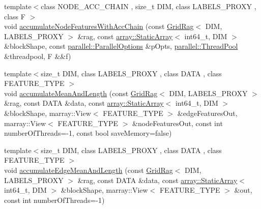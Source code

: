 \begin{DoxyCompactItemize}
\item 
{\footnotesize template$<$class N\+O\+D\+E\+\_\+\+A\+C\+C\+\_\+\+C\+H\+A\+I\+N , size\+\_\+t D\+I\+M, class L\+A\+B\+E\+L\+S\+\_\+\+P\+R\+O\+X\+Y , class F $>$ }\\void \hyperlink{namespacenifty_1_1graph_a1464a1e4da963bdaf932c41c042f734e}{accumulate\+Node\+Features\+With\+Acc\+Chain} (const \hyperlink{classnifty_1_1graph_1_1GridRag}{Grid\+Rag}$<$ D\+I\+M, L\+A\+B\+E\+L\+S\+\_\+\+P\+R\+O\+X\+Y $>$ \&rag, const \hyperlink{namespacenifty_1_1array_a683f151f19c851754e0c6d55ed16a0c2}{array\+::\+Static\+Array}$<$ int64\+\_\+t, D\+I\+M $>$ \&block\+Shape, const \hyperlink{classnifty_1_1parallel_1_1ParallelOptions}{parallel\+::\+Parallel\+Options} \&p\+Opts, \hyperlink{classnifty_1_1parallel_1_1ThreadPool}{parallel\+::\+Thread\+Pool} \&threadpool, F \&\&f)
\item 
{\footnotesize template$<$size\+\_\+t D\+I\+M, class L\+A\+B\+E\+L\+S\+\_\+\+P\+R\+O\+X\+Y , class D\+A\+T\+A , class F\+E\+A\+T\+U\+R\+E\+\_\+\+T\+Y\+P\+E $>$ }\\void \hyperlink{namespacenifty_1_1graph_afa27dafc0727ab9fb2d7e5e5fa23996b}{accumulate\+Mean\+And\+Length} (const \hyperlink{classnifty_1_1graph_1_1GridRag}{Grid\+Rag}$<$ D\+I\+M, L\+A\+B\+E\+L\+S\+\_\+\+P\+R\+O\+X\+Y $>$ \&rag, const D\+A\+T\+A \&data, const \hyperlink{namespacenifty_1_1array_a683f151f19c851754e0c6d55ed16a0c2}{array\+::\+Static\+Array}$<$ int64\+\_\+t, D\+I\+M $>$ \&block\+Shape, marray\+::\+View$<$ F\+E\+A\+T\+U\+R\+E\+\_\+\+T\+Y\+P\+E $>$ \&edge\+Features\+Out, marray\+::\+View$<$ F\+E\+A\+T\+U\+R\+E\+\_\+\+T\+Y\+P\+E $>$ \&node\+Features\+Out, const int number\+Of\+Threads=-\/1, const bool save\+Memory=false)
\item 
{\footnotesize template$<$size\+\_\+t D\+I\+M, class L\+A\+B\+E\+L\+S\+\_\+\+P\+R\+O\+X\+Y , class D\+A\+T\+A , class F\+E\+A\+T\+U\+R\+E\+\_\+\+T\+Y\+P\+E $>$ }\\void \hyperlink{namespacenifty_1_1graph_a44f9d32c6516b8a8fad328a7bffff8fe}{accumulate\+Edge\+Mean\+And\+Length} (const \hyperlink{classnifty_1_1graph_1_1GridRag}{Grid\+Rag}$<$ D\+I\+M, L\+A\+B\+E\+L\+S\+\_\+\+P\+R\+O\+X\+Y $>$ \&rag, const D\+A\+T\+A \&data, const \hyperlink{namespacenifty_1_1array_a683f151f19c851754e0c6d55ed16a0c2}{array\+::\+Static\+Array}$<$ int64\+\_\+t, D\+I\+M $>$ \&block\+Shape, marray\+::\+View$<$ F\+E\+A\+T\+U\+R\+E\+\_\+\+T\+Y\+P\+E $>$ \&out, const int number\+Of\+Threads=-\/1)
\item 

\end{DoxyCompactItemize}
